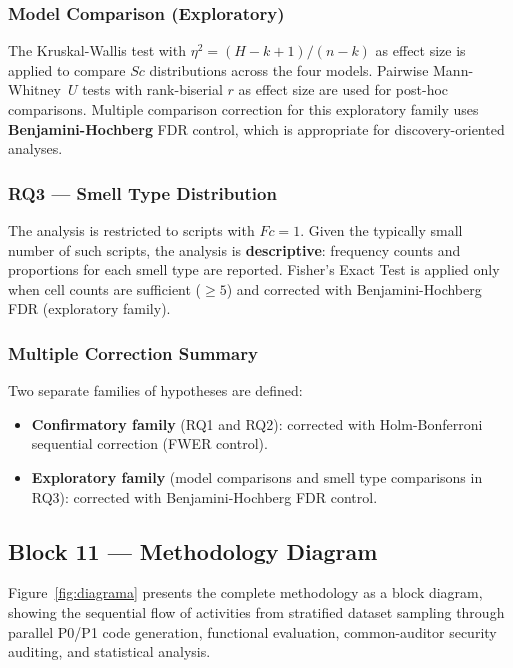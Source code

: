 \subsubsection{Model Comparison (Exploratory)}

The Kruskal-Wallis test with $\eta^2 = (H - k + 1)/(n - k)$ as
effect size is applied to compare $Sc$ distributions across the
four models. Pairwise Mann-Whitney~$U$ tests with rank-biserial
$r$ as effect size are used for post-hoc comparisons. Multiple
comparison correction for this exploratory family uses
\textbf{Benjamini-Hochberg} FDR control, which is appropriate for
discovery-oriented analyses.

\subsubsection{RQ3 --- Smell Type Distribution}

The analysis is restricted to scripts with $Fc = 1$. Given the
typically small number of such scripts, the analysis is
\textbf{descriptive}: frequency counts and proportions for each
smell type are reported. Fisher's Exact Test is applied only when
cell counts are sufficient ($\geq 5$) and corrected with
Benjamini-Hochberg FDR (exploratory family).

\subsubsection{Multiple Correction Summary}

Two separate families of hypotheses are defined:
\begin{itemize}
    \item \textbf{Confirmatory family} (RQ1 and RQ2): corrected with
          Holm-Bonferroni sequential correction (FWER control).
    \item \textbf{Exploratory family} (model comparisons and smell
          type comparisons in RQ3): corrected with
          Benjamini-Hochberg FDR control.
\end{itemize}

\subsection{Block 11 --- Methodology Diagram}
\label{sec:block11}

Figure~\ref{fig:diagrama} presents the complete methodology as a
block diagram, showing the sequential flow of activities from
stratified dataset sampling through parallel P0/P1 code generation,
functional evaluation, common-auditor security auditing, and
statistical analysis.

